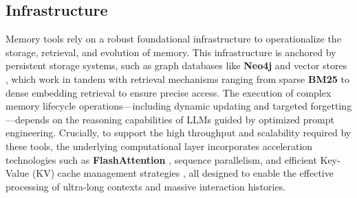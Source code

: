\documentclass[manuscript,screen]{acmart}
\begin{document}
\subsection{Infrastructure}
Memory tools rely on a robust foundational infrastructure to operationalize the storage, retrieval, and evolution of memory. This infrastructure is anchored by persistent storage systems, such as graph databases like \textbf{Neo4j} \citep{neo4j2012} and vector stores \citep{douze2024faiss}, which work in tandem with retrieval mechanisms ranging from sparse \textbf{BM25} \citep{robertson1995okapi} to dense embedding retrieval \citep{izacard2021unsupervised, openai_embeddings_2025} to ensure precise access. The execution of complex memory lifecycle operations—including dynamic updating and targeted forgetting—depends on the reasoning capabilities of LLMs \citep{achiam2023gpt, liu2024deepseek} guided by optimized prompt engineering. Crucially, to support the high throughput and scalability required by these tools, the underlying computational layer incorporates acceleration technologies such as \textbf{FlashAttention} \citep{dao2024flashattention}, sequence parallelism, and efficient Key-Value (KV) cache management strategies \citep{kwon2023efficient}, all designed to enable the effective processing of ultra-long contexts and massive interaction histories.

\end{document}
